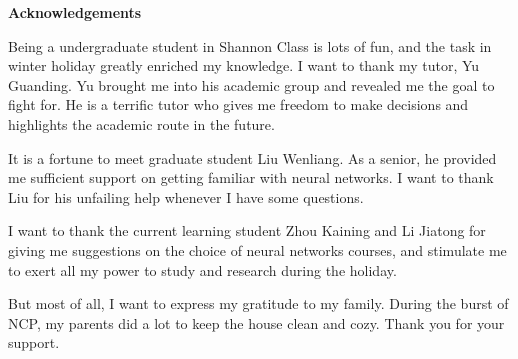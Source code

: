 \newpage
\begin{center}
    \bfseries {} Acknowledgements
\end{center}
Being a undergraduate student in Shannon Class is 
lots of fun, and the task in winter holiday greatly enriched 
my knowledge. I want to thank my tutor, Yu Guanding. Yu brought
me into his academic group and revealed me the goal to fight 
for. He is a terrific tutor who gives me freedom to make decisions
and highlights the academic route in the future.
\par It is a fortune to meet graduate student Liu Wenliang. As 
a senior, he provided me sufficient support on getting familiar 
with neural networks. I want to thank Liu for his unfailing help
whenever I have some questions.
\par I want to thank the current learning student Zhou Kaining and 
Li Jiatong for giving me suggestions on the choice of neural 
networks courses, and stimulate me to exert all my power to 
study and research during the holiday.
\par But most of all, I want to express my gratitude to my
family. During the burst of NCP, my parents did a lot to keep
the house clean and cozy. Thank you for your support.